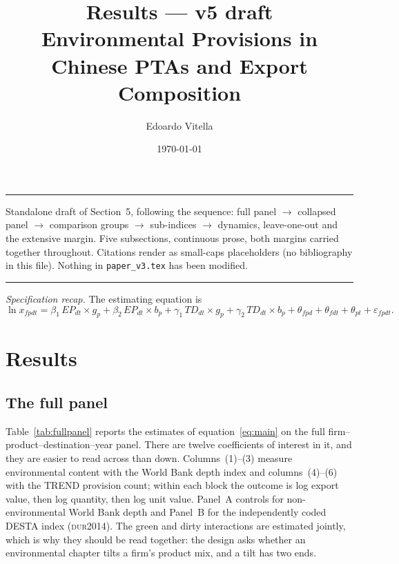 \documentclass[11pt]{article}
\title{\textbf{Results --- v5 draft}\\[6pt]
\large Environmental Provisions in Chinese PTAs and Export Composition}
\author{Edoardo Vitella}
\date{\today}
\newcommand{\citep}[1]{(\textsc{#1})}
\begin{document}
\maketitle

\noindent\rule{\textwidth}{0.4pt}
\footnotesize
Standalone draft of Section~5, following the sequence: full panel $\rightarrow$ collapsed panel
$\rightarrow$ comparison groups $\rightarrow$ sub-indices $\rightarrow$ dynamics, leave-one-out and
the extensive margin. Five subsections, continuous prose, both margins carried together throughout.
Citations render as small-caps placeholders (no bibliography in this file). Nothing in
\texttt{paper\_v3.tex} has been modified.
\normalsize
\noindent\rule{\textwidth}{0.4pt}

\vspace{10pt}
\noindent\emph{Specification recap.} The estimating equation is
\begin{equation}\label{eq:main}
\ln x_{fpdt} = \beta_1\, EP_{dt}\!\times\!g_p + \beta_2\, EP_{dt}\!\times\!b_p
+ \gamma_1\, TD_{dt}\!\times\!g_p + \gamma_2\, TD_{dt}\!\times\!b_p
+ \theta_{fpd} + \theta_{fdt} + \theta_{pt} + \varepsilon_{fpdt}.
\end{equation}

\section{Results}\label{sec:results}

\subsection{The full panel}\label{sec:fullpanel}

Table~\ref{tab:fullpanel} reports the estimates of equation~\eqref{eq:main} on the full
firm--product--destination--year panel. There are twelve coefficients of interest in it, and they are
easier to read across than down. Columns~(1)--(3) measure environmental content with the World Bank
depth index and columns~(4)--(6) with the TREND provision count; within each block the outcome is log
export value, then log quantity, then log unit value. Panel~A controls for non-environmental World
Bank depth and Panel~B for the independently coded DESTA index \citep{dur2014}. The green and dirty
interactions are estimated jointly, which is why they should be read together: the design asks
whether an environmental chapter tilts a firm's product mix, and a tilt has two ends.
\end{document}
